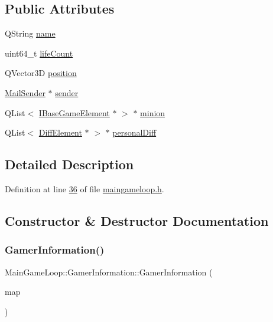 \subsection*{Public Attributes}
\begin{DoxyCompactItemize}
\item 
Q\+String \hyperlink{a00213_ad0a83bddcdd3756585fd5068a4316bde}{name}
\item 
uint64\+\_\+t \hyperlink{a00213_a94caf02405370097d83973a79e110f4d}{life\+Count}
\item 
Q\+Vector3D \hyperlink{a00213_a2cc12f0aed9d64271513fbce1615d73e}{position}
\item 
\hyperlink{a00205}{Mail\+Sender} $\ast$ \hyperlink{a00213_aebab9469416fa837ba9140f2bf2b280d}{sender}
\item 
Q\+List$<$ \hyperlink{a00137}{I\+Base\+Game\+Element} $\ast$ $>$ $\ast$ \hyperlink{a00213_adbf87a495da3003c15451e0ecad3bf14}{minion}
\item 
Q\+List$<$ \hyperlink{a00141}{Diff\+Element} $\ast$ $>$ $\ast$ \hyperlink{a00213_a4c89a46d22105667ff462e4e944daaac}{personal\+Diff}
\end{DoxyCompactItemize}


\subsection{Detailed Description}


Definition at line \hyperlink{a00092_source_l00036}{36} of file \hyperlink{a00092_source}{maingameloop.\+h}.



\subsection{Constructor \& Destructor Documentation}
\mbox{\label{a00213_a6b58de3576e4b204fc38073794dfa1d2}} 
\subsubsection{\texorpdfstring{Gamer\+Information()}{GamerInformation()}}
{\footnotesize\ttfamily Main\+Game\+Loop\+::\+Gamer\+Information\+::\+Gamer\+Information (\begin{DoxyParamCaption}\item[{\hyperlink{a00165}{I\+Map} $\ast$}]{map }\end{DoxyParamCaption})}



